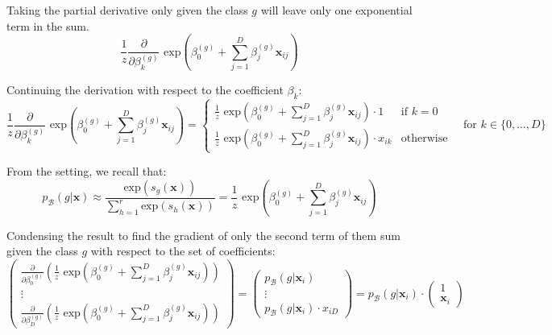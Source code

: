 \documentclass{article}
\begin{document}
Taking the partial derivative only given the class $g$ will leave only one exponential term in the sum.
\begin{equation*}
    \frac{1}{z} \frac{\partial}{\partial \beta_{k}^{(g)}} \text{ exp}\left ( \beta_{0}^{(g)} + \sum_{j = 1}^{D} \beta_{j}^{(g)} \boldsymbol x_{ij} \right )
\end{equation*}

Continuing the derivation with respect to the coefficient $\beta_{k}$:
\begin{equation*}
    \frac{1}{z} \frac{\partial}{\partial \beta_{k}^{(g)}} \text{ exp}\left ( \beta_{0}^{(g)} + \sum_{j = 1}^{D} \beta_{j}^{(g)} \boldsymbol x_{ij} \right ) = \begin{cases} \frac{1}{z} \text{ exp}\left ( \beta_{0}^{(g)} + \sum_{j = 1}^{D} \beta_{j}^{(g)} \boldsymbol x_{ij} \right ) \cdot 1 & \text{if } k = 0 \\ \frac{1}{z} \text{ exp}\left ( \beta_{0}^{(g)} + \sum_{j = 1}^{D} \beta_{j}^{(g)} \boldsymbol x_{ij} \right ) \cdot x_{ik} & \text{otherwise} \end{cases} \quad \text{for } k \in \{0, \ldots, D \}
\end{equation*}

From the setting, we recall that:
\begin{equation*}
    p_{\mathcal{B}}(g | \boldsymbol x) \approx \frac{\text{exp}(s_{g}(\boldsymbol x))}{\sum_{h = 1}^{r} \text{exp}(s_{h}(\boldsymbol x))} = \frac{1}{z} \text{ exp}\left ( \beta_{0}^{(g)} + \sum_{j = 1}^{D} \beta_{j}^{(g)} \boldsymbol x_{ij} \right )
\end{equation*}

Condensing the result to find the gradient of only the second term of them sum given the class $g$ with respect to the set of coefficients:
\begin{equation*}
    \begin{pmatrix}
    \frac{\partial}{\partial \beta_{0}^{(g)}} \left ( \frac{1}{z} \text{ exp}\left ( \beta_{0}^{(g)} + \sum_{j = 1}^{D} \beta_{j}^{(g)} \boldsymbol x_{ij} \right ) \right ) \\
    \vdots \\
    \frac{\partial}{\partial \beta_{D}^{(g)}} \left ( \frac{1}{z} \text{ exp}\left ( \beta_{0}^{(g)} + \sum_{j = 1}^{D} \beta_{j}^{(g)} \boldsymbol x_{ij} \right ) \right )
    \end{pmatrix} = \begin{pmatrix}
    p_{\mathcal{B}}(g | \boldsymbol x_{i}) \\ \vdots \\ p_{\mathcal{B}}(g | \boldsymbol x_{i}) \cdot x_{iD}
    \end{pmatrix} = p_{\mathcal{B}}(g | \boldsymbol x_{i}) \cdot \begin{pmatrix}
    1 \\ \boldsymbol x_{i}
    \end{pmatrix}
\end{equation*}
\end{document}
